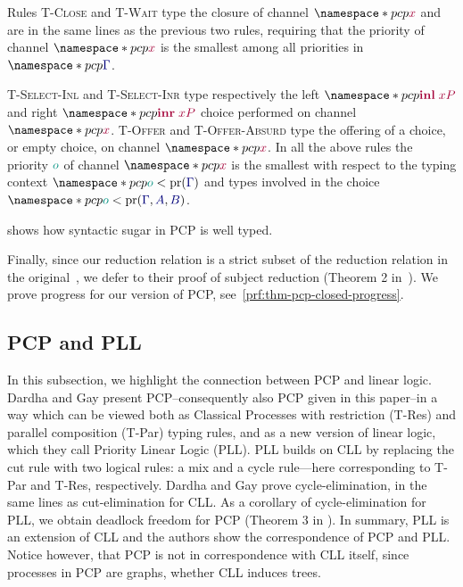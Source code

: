 Rules \textsc{T-Close} and \textsc{T-Wait} type the closure of channel $\pcp{\tm{x}}$ and are in the same lines as the previous two rules, requiring that the priority of channel $\pcp{\tm{x}}$ is the smallest among all priorities in $\pcp{\ty{\Gamma}}$.

\textsc{T-Select-Inl} and \textsc{T-Select-Inr} type respectively the left $\pcp{\tm{\inl{x}{P}}}$ and right $\pcp{\tm{\inr{x}{P}}}$ choice performed on channel $\pcp{\tm{x}}$. \textsc{T-Offer} and \textsc{T-Offer-Absurd} type the offering of a choice, or empty choice, on channel $\pcp{\tm{x}}$. In all the above rules the priority $\cs{o}$ of channel $\pcp{\tm{x}}$ is the smallest with respect to the typing context $\pcp{\cs{o}<\minpr(\ty{\Gamma})}$ and types involved in the choice $\pcp{\cs{o}<\minpr(\ty{\Gamma},\ty{A},\ty{B})}$.

 shows how syntactic sugar in PCP is well typed.


Finally, since our reduction relation is a strict subset of the reduction relation in the original~\cite{dardhagay18extended}, we defer to their proof of subject reduction (Theorem 2 in~\cite{dardhagay18extended}). We prove progress for our version of PCP, see~\cref{prf:thm-pcp-closed-progress}.


\subsection{PCP and PLL}
In this subsection, we highlight the connection between PCP and linear logic.
Dardha and Gay \cite{dardhagay18} present PCP--consequently also PCP given in this paper--in a way which can be viewed both as Classical Processes with restriction (T-Res) and parallel composition (T-Par) typing rules, and as a new version of linear logic, which they call Priority Linear Logic (PLL).
PLL builds on CLL by replacing the cut rule with two logical rules: a mix and a cycle rule---here corresponding to T-Par and T-Res, respectively. Dardha and Gay \cite[\S 4]{dardhagay18} prove cycle-elimination, in the same lines as cut-elimination for CLL. As a corollary of cycle-elimination for PLL, we obtain deadlock freedom for PCP (Theorem 3 in \cite[\S 4]{dardhagay18}). In summary, PLL is an extension of CLL and the authors show the correspondence of PCP and PLL. Notice however, that PCP is not in correspondence with CLL itself, since processes in PCP are graphs, whether CLL induces trees.

